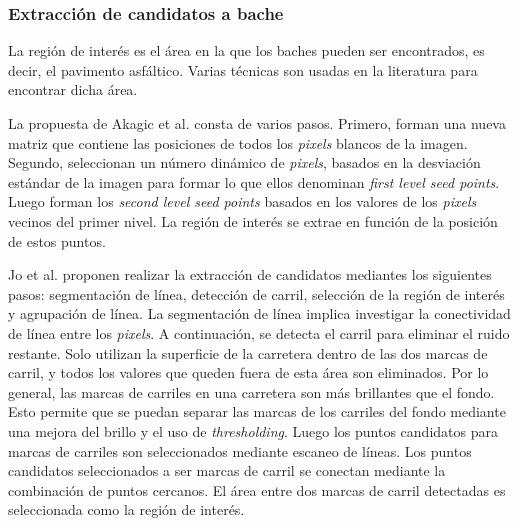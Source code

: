 
		\subsubsection{Extracción de candidatos a bache}
		La región de interés es el área en la que los baches pueden ser encontrados, es decir, el pavimento asfáltico.
		Varias técnicas son usadas en la literatura para encontrar dicha área. 

		La propuesta de Akagic et al. consta de varios pasos. Primero, forman una nueva matriz que contiene las posiciones 
		de todos los \emph{pixels} blancos de la imagen. Segundo, seleccionan un número dinámico de \emph{pixels}, basados 
		en la desviación estándar de la imagen para formar lo que ellos denominan \emph{first level seed points}. Luego forman  los 
		\emph{second level seed points} basados en los valores de los \emph{pixels} vecinos del primer nivel. La región de
		interés se extrae en función de la posición de estos puntos.
		

		Jo et al. proponen realizar la extracción de candidatos mediantes los siguientes pasos: segmentación de línea, 
		detección de carril, selección de la región de interés y agrupación de línea. La segmentación de línea implica investigar la conectividad 
		de línea entre los \emph{pixels}. A continuación, se detecta el carril para eliminar el ruido restante. Solo utilizan la superficie de la 
		carretera dentro de las dos marcas de carril, y todos los valores que queden fuera de esta área son eliminados. Por lo general, las marcas 
		de carriles en una carretera son más brillantes que el fondo. Esto permite que  se puedan separar las marcas de los carriles del fondo mediante 
		una  mejora del brillo y el uso de \emph{thresholding}. Luego los puntos candidatos para marcas de carriles son seleccionados mediante escaneo de 
		líneas. Los puntos candidatos seleccionados a ser marcas de carril se conectan mediante la combinación de puntos cercanos. El área entre 
		dos marcas de carril detectadas es seleccionada como la región de interés. 

